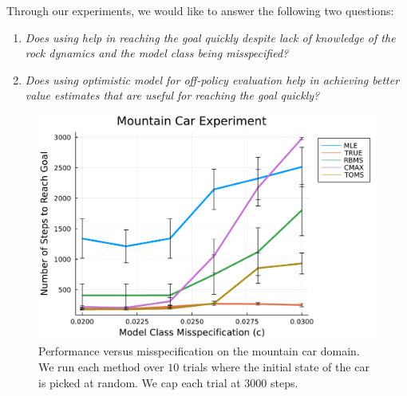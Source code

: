 Through our experiments, we would like to answer the following two
questions:
\begin{enumerate}
\item \textit{Does using \taml{} help in reaching the goal quickly
    despite lack of knowledge of the rock dynamics and the model class
    being misspecified?}
\item \textit{Does using optimistic model for off-policy evaluation
    help in achieving better value estimates that are useful for
    reaching the goal quickly?}
\end{enumerate}

\begin{figure}[t]
  \centering
\includegraphics[width=0.6\linewidth]{figures/taml/mountain_car_online_model_search_all_dense.pdf} 
  \caption{Performance versus misspecification on the mountain car
    domain. We run each method over $10$ trials where the initial
    state of the car is picked at random. We cap each trial at $3000$
    steps.}
  \label{fig:performance}
\end{figure}


